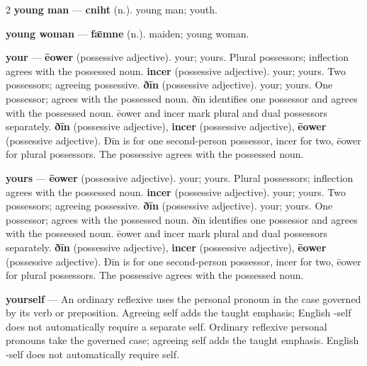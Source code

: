 \begin{multicols}{2}
\textbf{young man} — \textbf{cniht} (n.). young man; youth.\par
\textbf{young woman} — \textbf{fǣmne} (n.). maiden; young woman.\par
\textbf{your} — \textbf{ēower} (possessive adjective). your; yours. Plural possessors; inflection agrees with the possessed noun. \textbf{incer} (possessive adjective). your; yours. Two possessors; agreeing possessive. \textbf{ðīn} (possessive adjective). your; yours. One possessor; agrees with the possessed noun. ðīn identifies one possessor and agrees with the possessed noun. ēower and incer mark plural and dual possessors separately. \textbf{ðīn} (possessive adjective), \textbf{incer} (possessive adjective), \textbf{ēower} (possessive adjective). Ðīn is for one second-person possessor, incer for two, ēower for plural possessors. The possessive agrees with the possessed noun.\par
\textbf{yours} — \textbf{ēower} (possessive adjective). your; yours. Plural possessors; inflection agrees with the possessed noun. \textbf{incer} (possessive adjective). your; yours. Two possessors; agreeing possessive. \textbf{ðīn} (possessive adjective). your; yours. One possessor; agrees with the possessed noun. ðīn identifies one possessor and agrees with the possessed noun. ēower and incer mark plural and dual possessors separately. \textbf{ðīn} (possessive adjective), \textbf{incer} (possessive adjective), \textbf{ēower} (possessive adjective). Ðīn is for one second-person possessor, incer for two, ēower for plural possessors. The possessive agrees with the possessed noun.\par
\textbf{yourself} — An ordinary reflexive uses the personal pronoun in the case governed by its verb or preposition. Agreeing self adds the taught emphasis; English -self does not automatically require a separate self. Ordinary reflexive personal pronouns take the governed case; agreeing self adds the taught emphasis. English -self does not automatically require self.\par

\end{multicols}
